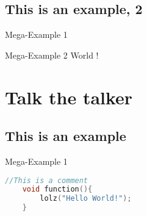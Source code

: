 \documentclass[aspectratio=169,usepdftitle=true]{beamer}
\def\typesetBox#1#2#3#4{%
    \pbox{7cm}{{\Large\sbfamily#1}\rlap{\textsuperscript{\color{gray}\cite{#4}}}\\\color{gray}#2\hfill#3}%
}
\begin{document}
\subsection{This is an example, 2}

\begin{frame}{Mega-Example 1}
    \begin{layout-imageonly}
    \end{layout-imageonly}
\end{frame}

\begin{frame}{Mega-Example 2}
    World \cite{knuth-web}!
\end{frame}

\section{Talk the talker}
\subsection{This is an example}
\SidebarReset
{}
\begin{frame}[fragile]{Mega-Example 1}
    \begin{lstlisting}[language = C]
    //This is a comment
    void function(){
        lolz("Hello World!");
    }
    \end{lstlisting}
\end{frame}
\end{document}
